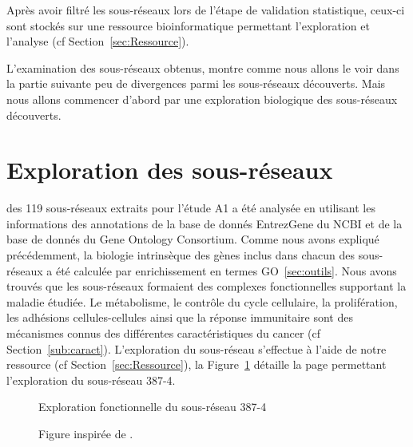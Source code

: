 		Après avoir filtré les sous-réseaux lors de l'étape de validation statistique, ceux-ci sont stockés sur une ressource bioinformatique permettant l'exploration et l'analyse (cf Section~\ref{sec:Ressource}).

\pagebreak

		L'examination des sous-réseaux obtenus, montre comme nous allons le voir dans la partie suivante peu de divergences parmi les sous-réseaux découverts.
		Mais nous allons commencer d'abord par une exploration biologique des sous-réseaux découverts.

	\section{\textcolor{green!45!black}{Exploration des sous-réseaux}}\label{sec:Exploration}
		 des 119 sous-réseaux extraits pour l'étude A1 a été analysée en utilisant les informations des annotations de la base de donnés EntrezGene du NCBI et de la base de donnés du Gene Ontology Consortium.
		Comme nous avons expliqué précédemment, la biologie intrinsèque des gènes inclus dans chacun des sous-réseaux a été calculée par enrichissement en termes \acs{GO}~\ref{sec:outils}.
		Nous avons trouvés que les sous-réseaux formaient des complexes fonctionnelles supportant la maladie étudiée.
		Le métabolisme, le contrôle du cycle cellulaire, la prolifération, les adhésions cellules-cellules ainsi que la réponse immunitaire sont des mécanismes connus des différentes caractéristiques du cancer (cf Section~\ref{sub:caract}).
		L'exploration du sous-réseau s'effectue à l'aide de notre ressource (cf Section~\ref{sec:Ressource}), la Figure~\ref{fig:Network} détaille la page permettant l'exploration du sous-réseau 387-4.

		\begin{figure}
			\begin{center}
				\def\svgwidth{\columnwidth}
				\caption{Exploration fonctionnelle du sous-réseau 387-4}
				\label{fig:Network}
			\end{center}
			\caption*{Figure inspirée de \citeauthor{Garcia2011}.}
		\end{figure}

